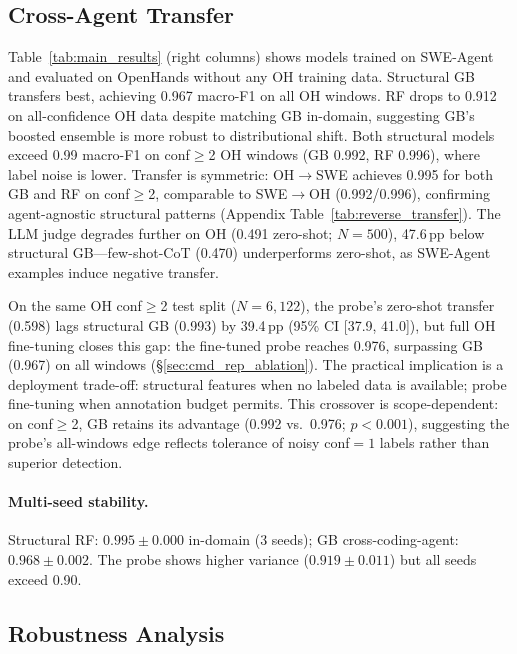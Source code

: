 \subsection{Cross-Agent Transfer}
\label{sec:cross_agent}

Table~\ref{tab:main_results} (right columns) shows models trained on SWE-Agent and evaluated on OpenHands without any OH training data.
Structural GB transfers best, achieving 0.967 macro-F1 on all OH windows.
RF drops to 0.912 on all-confidence OH data despite matching GB in-domain, suggesting GB's boosted ensemble is more robust to distributional shift.
Both structural models exceed 0.99 macro-F1 on conf${\geq}$2 OH windows (GB 0.992, RF 0.996), where label noise is lower.
Transfer is symmetric: OH$\to$SWE achieves 0.995 for both GB and RF on conf${\geq}$2, comparable to SWE$\to$OH (0.992/0.996), confirming agent-agnostic structural patterns (Appendix Table~\ref{tab:reverse_transfer}).
The LLM judge degrades further on OH (0.491 zero-shot; $N{=}500$), 47.6\,pp below structural GB---few-shot-CoT (0.470) underperforms zero-shot, as SWE-Agent examples induce negative transfer.

On the same OH conf${\geq}$2 test split ($N{=}6{,}122$), the probe's zero-shot transfer (0.598) lags structural GB (0.993) by 39.4\,pp (95\% CI [37.9, 41.0]), but full OH fine-tuning closes this gap: the fine-tuned probe reaches 0.976, surpassing GB (0.967) on all windows (\S\ref{sec:cmd_rep_ablation}).
The practical implication is a deployment trade-off: structural features when no labeled data is available; probe fine-tuning when annotation budget permits.
This crossover is scope-dependent: on conf${\geq}$2, GB retains its advantage (0.992 vs.\ 0.976; $p{<}0.001$), suggesting the probe's all-windows edge reflects tolerance of noisy conf${=}1$ labels rather than superior detection.

\paragraph{Multi-seed stability.}
Structural RF: $0.995{\pm}0.000$ in-domain (3 seeds); GB cross-coding-agent: $0.968{\pm}0.002$.
The probe shows higher variance ($0.919{\pm}0.011$) but all seeds exceed 0.90.

\subsection{Robustness Analysis}
\label{sec:robustness}


